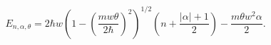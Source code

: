 \begin{equation}
E_{n,\alpha,\theta}=2\hbar w\left(  1-\left(  \frac{mw\theta}{2\hbar}\right)
^{2}\right)  ^{1/2}\left(  n+\frac{\left|  \alpha\right|  +1}{2}\right)
-\frac{m\theta w^{2}\alpha}{2}.\label{36.9}%
\end{equation}

